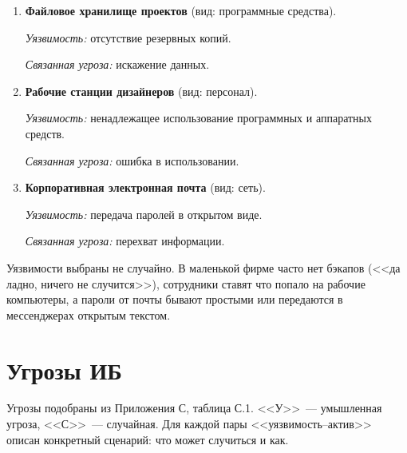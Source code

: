 \documentclass[a4paper,14pt]{extarticle}
\begin{document}
\begin{enumerate}[label=\textbf{\arabic*.}]
\item \textbf{Файловое хранилище проектов} (вид: программные средства).

\textit{Уязвимость:} отсутствие резервных копий.

\textit{Связанная угроза:} искажение данных.

\item \textbf{Рабочие станции дизайнеров} (вид: персонал).

\textit{Уязвимость:} ненадлежащее использование программных и аппаратных средств.

\textit{Связанная угроза:} ошибка в использовании.

\item \textbf{Корпоративная электронная почта} (вид: сеть).

\textit{Уязвимость:} передача паролей в открытом виде.

\textit{Связанная угроза:} перехват информации.
\end{enumerate}

Уязвимости выбраны не случайно. В маленькой фирме часто нет бэкапов (<<да ладно, ничего не случится>>), сотрудники ставят что попало на рабочие компьютеры, а пароли от почты бывают простыми или передаются в мессенджерах открытым текстом.

\section{Угрозы ИБ}

Угрозы подобраны из Приложения С, таблица С.1. <<У>>~--- умышленная угроза, <<С>>~--- случайная. Для каждой пары <<уязвимость--актив>> описан конкретный сценарий: что может случиться и как.
\end{document}
